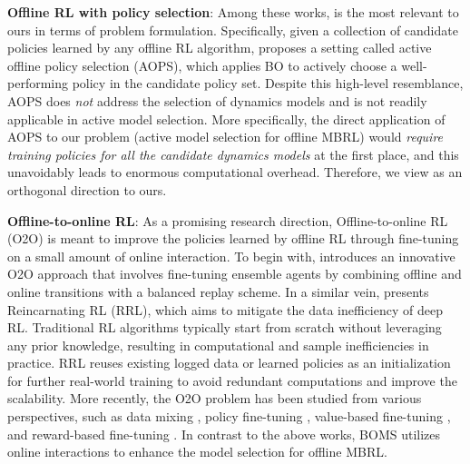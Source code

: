 \textbf{Offline RL with policy selection}: Among these works, \citep{konyushova2021active} is the most relevant to ours in terms of problem formulation. Specifically, given a collection of candidate policies learned by any offline RL algorithm, \citep{konyushova2021active} proposes a setting called active offline policy selection (AOPS), which applies BO to actively choose a well-performing policy in the candidate policy set. Despite this high-level resemblance, AOPS does \textit{not} address the selection of dynamics models and is not readily applicable in active model selection. More specifically, the direct application of AOPS to our problem (\ie active model selection for offline MBRL) would \textit{require training policies for all the candidate dynamics models} at the first place, and this unavoidably leads to enormous computational overhead. Therefore, we view \citep{konyushova2021active} as an orthogonal direction to ours.

\textbf{Offline-to-online RL}: As a promising research direction, Offline-to-online RL (O2O) is meant to improve the policies learned by offline RL through fine-tuning on a small amount of online interaction.
To begin with, \citep{lee2022offline} introduces an innovative O2O approach that involves fine-tuning ensemble agents by combining offline and online transitions with a balanced replay scheme.
In a similar vein, \citep{agarwal2022reincarnating} presents Reincarnating RL (RRL), which aims to mitigate the data inefficiency of deep RL. Traditional RL algorithms typically start from scratch without leveraging any prior knowledge, resulting in computational and sample inefficiencies in practice. RRL reuses existing logged data or learned policies as an initialization for further real-world training to avoid redundant computations and improve the scalability.
More recently, the O2O problem has been studied from various perspectives, such as data mixing \citep{zheng2023adaptive,ball2023efficient}, policy fine-tuning \citep{xie2021policy,uchendu2023jump,zhang2023policy}, value-based fine-tuning \citep{zhang2024perspective}, and reward-based fine-tuning \citep{nair2023learning}. In contrast to the above works, BOMS utilizes online interactions to enhance the model selection for offline MBRL.

